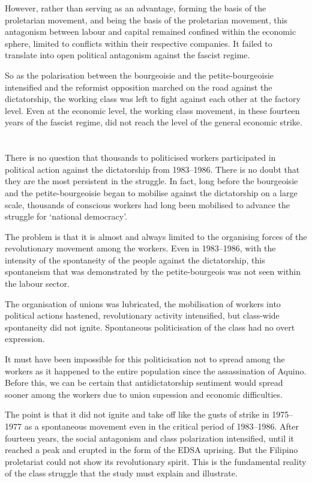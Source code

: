 However, rather than serving as an advantage,
forming the basis of the proletarian movement, 
and being the basis of the proletarian movement, 
this antagonism between labour and capital 
remained confined within the economic sphere,
limited to conflicts within their respective companies.
It failed to translate into open political antagonism against the fascist regime.

So as the polarisation between the bourgeoisie 
and the petite-bourgeoisie intensified 
and the reformist opposition marched on the road against the dictatorship, 
the working class was left to fight against each other at the factory level. 
Even at the economic level, 
the working class movement, 
in these fourteen years of the fascist regime, 
did not reach the level of the general economic strike.


\section{}
There is no question 
that thousands to politicised workers 
participated in political action 
against the dictatorship from 1983--1986.
There is no doubt
that they are the most persistent in the struggle.
In fact, 
long before the bourgeoisie and the petite-bourgeoisie 
began to mobilise against the dictatorship on a large scale,
thousands of conscious workers had long been mobilised
to advance the struggle for `national democracy'.

The problem is that 
it is almost and always limited 
to the organising forces of the revolutionary movement among the workers.
Even in 1983--1986, 
with the intensity of the spontaneity of the people against the dictatorship,
this spontaneism that was demonstrated by the petite-bourgeois
was not seen within the labour sector.

The organisation of unions was lubricated,
the mobilisation of workers
into political actions hastened,
revolutionary activity intensified,
but class-wide spontaneity did not ignite. 
Spontaneous politicisation of the class 
had no overt expression.

It must have been impossible for this politicisation 
not to spread among the workers
as it happened to the entire population 
since the assassination of Aquino. 
Before this, we can be certain
that antidictatorship sentiment 
would spread sooner 
among the workers
due to union supession and economic difficulties.

The point is that it did not ignite and take off 
like the gusts of strike in 1975--1977 
as a spontaneous movement even in the critical period of 1983--1986. 
After fourteen years, 
the social antagonism and class polarization intensified,
until it reached a peak and erupted 
in the form of the EDSA uprising. 
But the Filipino proletariat could not show its revolutionary spirit. 
This is the fundamental reality of the class struggle 
that the study must explain and illustrate.


